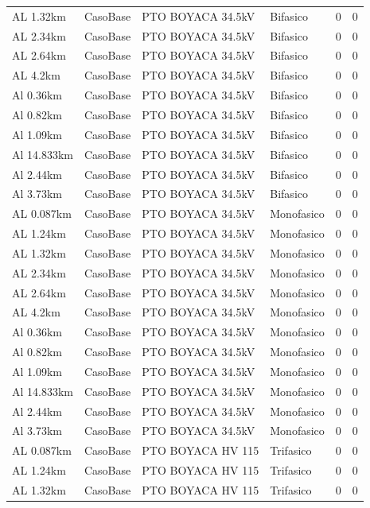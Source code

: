 \documentclass[11pt,a4paper]{article}
\begin{document}
\begin{longtable}{llllrr}
AL 1.32km & CasoBase & PTO BOYACA 34.5kV & Bifasico & 0 & 0 \\
AL 2.34km & CasoBase & PTO BOYACA 34.5kV & Bifasico & 0 & 0 \\
AL 2.64km & CasoBase & PTO BOYACA 34.5kV & Bifasico & 0 & 0 \\
AL 4.2km & CasoBase & PTO BOYACA 34.5kV & Bifasico & 0 & 0 \\
Al 0.36km & CasoBase & PTO BOYACA 34.5kV & Bifasico & 0 & 0 \\
Al 0.82km & CasoBase & PTO BOYACA 34.5kV & Bifasico & 0 & 0 \\
Al 1.09km & CasoBase & PTO BOYACA 34.5kV & Bifasico & 0 & 0 \\
Al 14.833km & CasoBase & PTO BOYACA 34.5kV & Bifasico & 0 & 0 \\
Al 2.44km & CasoBase & PTO BOYACA 34.5kV & Bifasico & 0 & 0 \\
Al 3.73km & CasoBase & PTO BOYACA 34.5kV & Bifasico & 0 & 0 \\
AL 0.087km & CasoBase & PTO BOYACA 34.5kV & Monofasico & 0 & 0 \\
AL 1.24km & CasoBase & PTO BOYACA 34.5kV & Monofasico & 0 & 0 \\
AL 1.32km & CasoBase & PTO BOYACA 34.5kV & Monofasico & 0 & 0 \\
AL 2.34km & CasoBase & PTO BOYACA 34.5kV & Monofasico & 0 & 0 \\
AL 2.64km & CasoBase & PTO BOYACA 34.5kV & Monofasico & 0 & 0 \\
AL 4.2km & CasoBase & PTO BOYACA 34.5kV & Monofasico & 0 & 0 \\
Al 0.36km & CasoBase & PTO BOYACA 34.5kV & Monofasico & 0 & 0 \\
Al 0.82km & CasoBase & PTO BOYACA 34.5kV & Monofasico & 0 & 0 \\
Al 1.09km & CasoBase & PTO BOYACA 34.5kV & Monofasico & 0 & 0 \\
Al 14.833km & CasoBase & PTO BOYACA 34.5kV & Monofasico & 0 & 0 \\
Al 2.44km & CasoBase & PTO BOYACA 34.5kV & Monofasico & 0 & 0 \\
Al 3.73km & CasoBase & PTO BOYACA 34.5kV & Monofasico & 0 & 0 \\
AL 0.087km & CasoBase & PTO BOYACA HV 115 & Trifasico & 0 & 0 \\
AL 1.24km & CasoBase & PTO BOYACA HV 115 & Trifasico & 0 & 0 \\
AL 1.32km & CasoBase & PTO BOYACA HV 115 & Trifasico & 0 & 0 \\

\end{longtable}
\end{document}
